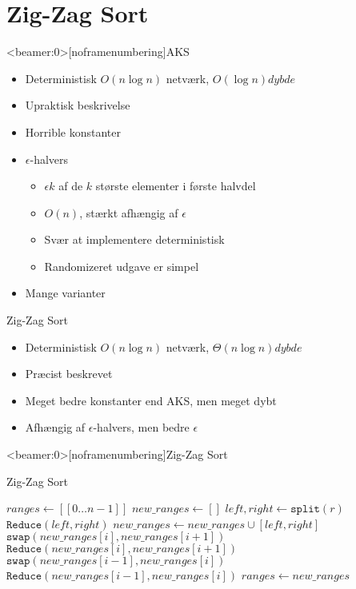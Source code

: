 \section{Zig-Zag Sort}

\begin{frame}<beamer:0>[noframenumbering]{AKS}
	\begin{itemize}
		\item Deterministisk $O(n \log n)$ netværk, $O(\log n) dybde$
		\item Upraktisk beskrivelse
		\item Horrible konstanter
		\item $\epsilon$-halvers
			\begin{itemize}
				\item $\epsilon k$ af de $k$ største elementer i første halvdel
				\item $O(n)$, stærkt afhængig af $\epsilon$
				\item Svær at implementere deterministisk
				\item Randomizeret udgave er simpel
			\end{itemize}
		\item Mange varianter
	\end{itemize}
\end{frame}

\begin{frame}{Zig-Zag Sort}
	\begin{itemize}
		\item Deterministisk $O(n \log n)$ netværk, $\Theta(n \log n) dybde$
		\item Præcist beskrevet
		\item Meget bedre konstanter end AKS, men meget dybt
		\item Afhængig af $\epsilon$-halvers, men bedre $\epsilon$
	\end{itemize}
\end{frame}

\begin{frame}<beamer:0>[noframenumbering]{Zig-Zag Sort}
	\begin{block}{Zig-Zag Sort}
 	\tiny
 		\begin{algorithmic}
				\State $ranges \gets [[0 \dots n-1]]$
					\State $new\_ranges \gets []$
						\State $left, right \gets \mathtt{split}(r)$
						\State $\mathtt{Reduce}(left, right)$
						\State $new\_ranges \gets new\_ranges \cup [left, right]$
					\EndFor
					 	\State $\mathtt{swap}(new\_ranges[i], new\_ranges[i+1])$
					 	\State $\mathtt{Reduce}(new\_ranges[i], new\_ranges[i+1])$
					\EndFor{}
					 	\State $\mathtt{swap}(new\_ranges[i-1], new\_ranges[i])$
					 	\State $\mathtt{Reduce}(new\_ranges[i-1], new\_ranges[i])$
					\EndFor
					\State $ranges \gets new\_ranges$
				\EndFor
			\EndProcedure
		\end{algorithmic}
	\end{block}
\end{frame}

